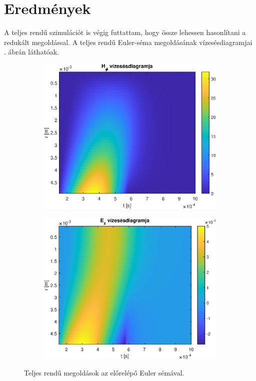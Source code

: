     \section{Eredmények}
        A teljes rendű szimulációt is végig futtattam, hogy össze lehessen hasonlítani a redukált megoldással. A teljes rendű Euler-séma megoldásának vízesésdiagramjai . ábrán láthatóak.
        \begin{figure}[h]
            \centering
            \begin{subfigure}{0.48\textwidth}
                \includegraphics[width=\textwidth]{kep/euler_0.15_4_hphi_waterfall.eps}
            \end{subfigure}
            \begin{subfigure}{0.48\textwidth}
                \includegraphics[width=\textwidth]{kep/euler_0.15_4_ez_waterfall.eps}
            \end{subfigure}
            \caption{Teljes rendű megoldások az előrelépő Euler sémával.}
            \label{fig:vizeses}
        \end{figure}
